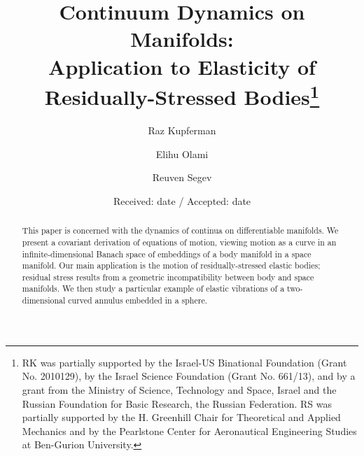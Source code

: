\documentclass[smallextended]{svjour3}
\begin{document}
\title{Continuum Dynamics on Manifolds: \\Application to Elasticity of Residually-Stressed Bodies\thanks{
RK was partially supported by the Israel-US Binational Foundation (Grant No. 2010129), by the Israel Science Foundation (Grant No. 661/13), and by a grant from the Ministry of Science, Technology and Space, Israel and the Russian Foundation for Basic Research, the Russian Federation.
RS was partially supported by 
the H. Greenhill Chair for Theoretical and Applied Mechanics and by the Pearlstone Center for Aeronautical Engineering Studies at Ben-Gurion University.
}
}

\author{Raz Kupferman \and Elihu Olami  \and Reuven Segev
}


\date{Received: date / Accepted: date}

\maketitle

\begin{abstract}
This paper is concerned with the dynamics of continua on differentiable manifolds. 
We present a covariant derivation of equations of motion, viewing motion as a curve in an infinite-dimensional Banach space of embeddings of a body manifold in a space manifold. Our main application is the motion of residually-stressed  elastic bodies; residual stress results from a geometric incompatibility between body and space manifolds. 
We then study a particular example of elastic vibrations of a two-dimensional curved annulus embedded in a sphere.

\end{abstract}
\end{document}
